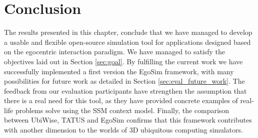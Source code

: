\section{Conclusion} %
\label{sec:eval_conclusion}
The results presented in this chapter, conclude that we have managed to develop a usable and flexible open-source simulation tool for applications designed based on the egocentric interaction paradigm. We have managed to satisfy the objectives laid out in Section \ref{sec:goal}. By fulfilling the current work we have successfully implemented a first version the EgoSim framework, with many possibilities for future work as detailed in Section \ref{sec:eval_future_work}. The feedback from our evaluation participants have strengthen the assumption that there is a real need for this tool, as they have provided concrete examples of real-life problems solve using the SSM context model. Finally, the comparison between UbiWise, TATUS and EgoSim confirms that this framework contributes with another dimension to the worlds of 3D ubiquitous computing simulators.

